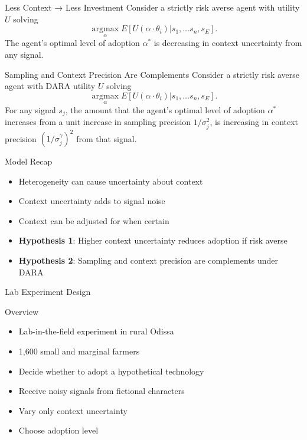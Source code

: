 \documentclass[
  ignorenonframetext,
]{beamer}
\providecommand{\tightlist}{%
  \setlength{\itemsep}{0pt}\setlength{\parskip}{0pt}}\usepackage{longtable,booktabs,array}
\begin{document}
\begin{frame}{Less Context → Less Investment}
\protect\hypertarget{less-context-less-investment}{}
Consider a strictly risk averse agent with utility \(U\) solving \[ 
\operatorname*{argmax}_\alpha E[U(\alpha \cdot \theta_i ) | s_1, \ldots s_n, s_E].
\] The agent's optimal level of adoption \(\alpha^*\) is decreasing in
context uncertainty from any signal.
\end{frame}

\begin{frame}{Sampling and Context Precision Are Complements}
\protect\hypertarget{sampling-and-context-precision-are-complements}{}
Consider a strictly risk averse agent with DARA utility \(U\) solving
\[ 
\operatorname*{argmax}_\alpha E[U(\alpha \cdot \theta_i ) | s_1, \ldots s_n, s_E].
\] For any signal \(s_j\), the amount that the agent's optimal level of
adoption \(\alpha^*\) increases from a unit increase in sampling
precision \(1/\sigma_j^2\), is increasing in context precision
\((1/\sigma_j^\gamma)^2\) from that signal.
\end{frame}

\begin{frame}{Model Recap}
\protect\hypertarget{model-recap}{}
\begin{itemize}[<+->]
\tightlist
\item
  Heterogeneity can cause uncertainty about context
\item
  Context uncertainty adds to signal noise
\item
  Context can be adjusted for when certain
\item
  \textbf{Hypothesis 1}: Higher context uncertainty reduces adoption if
  risk averse
\item
  \textbf{Hypothesis 2}: Sampling and context precision are complements
  under DARA
\end{itemize}
\end{frame}

\begin{frame}{Lab Experiment Design}
\protect\hypertarget{lab-experiment-design}{}
\end{frame}

\begin{frame}{Overview}
\protect\hypertarget{overview}{}
\begin{itemize}[<+->]
\tightlist
\item
  Lab-in-the-field experiment in rural Odissa
\item
  1,600 small and marginal farmers
\item
  Decide whether to adopt a hypothetical technology
\item
  Receive noisy signals from fictional characters
\item
  Vary only context uncertainty
\item
  Choose adoption level
\end{itemize}
\end{frame}
\end{document}
